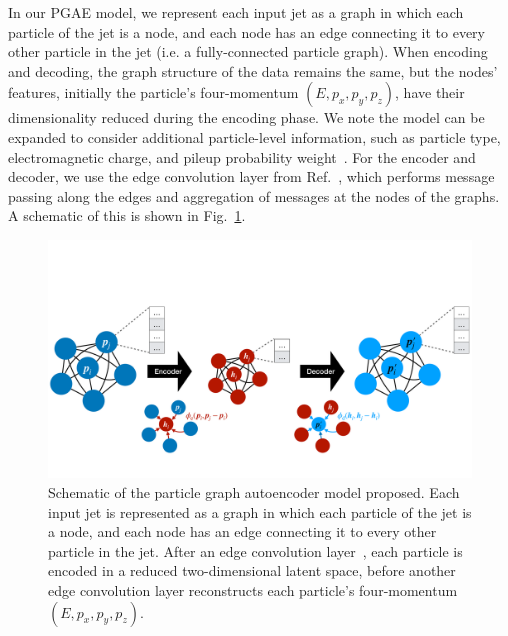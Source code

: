 \documentclass[letterpaper,11pt]{article}
\begin{document}
In our PGAE model, we represent each input jet as a graph in which each particle of the jet is a node, and each node has an edge connecting it to every other particle in the jet (i.e. a fully-connected particle graph).
When encoding and decoding, the graph structure of the data remains the same, but the nodes' features, initially the particle's four-momentum $(E, p_x, p_y, p_z)$, have their dimensionality reduced during the encoding phase.
We note the model can be expanded to consider additional particle-level information, such as particle type, electromagnetic charge, and pileup probability weight~\cite{Bertolini:2014bba}.
For the encoder and decoder, we use the edge convolution layer from Ref.~\cite{DGCNN}, which performs message passing along the edges and aggregation of messages at the nodes of the graphs.
A schematic of this is shown in Fig.~\ref{fig:gae}. 


\begin{figure}[htpb]
    \centering
    \includegraphics[width=\textwidth]{figures/GAE_new.pdf}
    \caption{Schematic of the particle graph autoencoder model proposed. 
    Each input jet is represented as a graph in which each particle of the jet is a node, and each node has an edge connecting it to every other particle in the jet.
    After an edge convolution layer~\cite{DGCNN}, each particle is encoded in a reduced two-dimensional latent space, before another edge convolution layer reconstructs each particle's four-momentum $(E, p_x, p_y, p_z)$.
}
    \label{fig:gae}
\end{figure}
\end{document}

